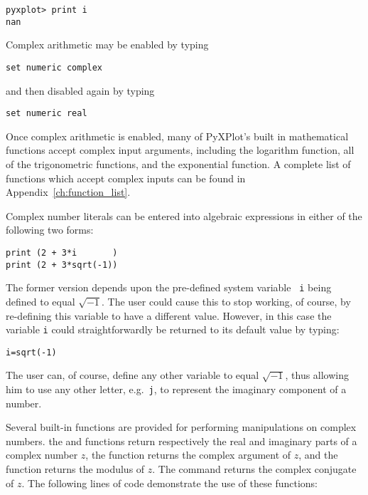 \begin{verbatim}
pyxplot> print i
nan
\end{verbatim}

Complex arithmetic may be enabled by typing

\begin{verbatim}
set numeric complex
\end{verbatim}

\noindent and then disabled again by typing

\begin{verbatim}
set numeric real
\end{verbatim}

Once complex arithmetic is enabled, many of PyXPlot's built in mathematical
functions accept complex input arguments, including the logarithm function, all
of the trigonometric functions, and the exponential function.  A complete list
of functions which accept complex inputs can be found in
Appendix~\ref{ch:function_list}.

Complex number literals can be entered into algebraic expressions in either of
the following two forms:

\begin{verbatim}
print (2 + 3*i       )
print (2 + 3*sqrt(-1))
\end{verbatim}

\noindent The former version depends upon the pre-defined system variable {\tt
i} being defined to equal $\sqrt{-1}$. The user could cause this to stop working,
of course, by re-defining this variable to have a different value.  However, in
this case the variable {\tt i} could straightforwardly be returned to its
default value by typing:

\begin{verbatim}
i=sqrt(-1)
\end{verbatim}

\noindent The user can, of course, define any other variable to equal
$\sqrt{-1}$, thus allowing him to use any other letter, e.g.\ {\tt j}, to
represent the imaginary component of a number.

Several built-in functions are provided for performing manipulations on complex
numbers. the  and  functions return respectively
the real and imaginary parts of a complex number $z$, the 
function returns the complex argument of $z$, and the  function
returns the modulus of $z$.  The  command returns the
complex conjugate of $z$. The following lines of code demonstrate the use of
these functions:

